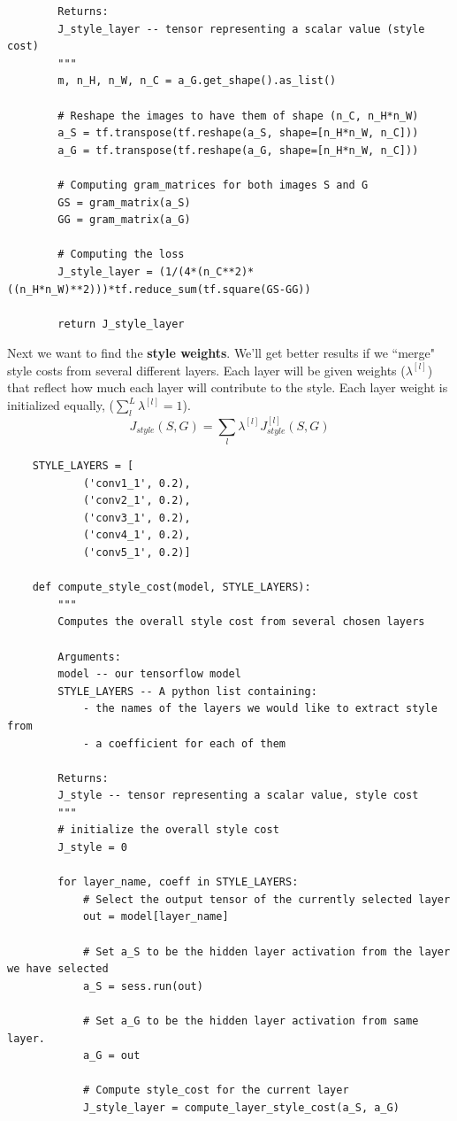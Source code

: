 \documentclass[11pt, a4paper]{article}
\begin{document}
\begin{spacing}{1.1}
\begin{lstlisting}
		Returns: 
		J_style_layer -- tensor representing a scalar value (style cost)
		"""
		m, n_H, n_W, n_C = a_G.get_shape().as_list()
		
		# Reshape the images to have them of shape (n_C, n_H*n_W) 
		a_S = tf.transpose(tf.reshape(a_S, shape=[n_H*n_W, n_C]))
		a_G = tf.transpose(tf.reshape(a_G, shape=[n_H*n_W, n_C]))
		
		# Computing gram_matrices for both images S and G 
		GS = gram_matrix(a_S)
		GG = gram_matrix(a_G)
		
		# Computing the loss
		J_style_layer = (1/(4*(n_C**2)*((n_H*n_W)**2)))*tf.reduce_sum(tf.square(GS-GG))
		
		return J_style_layer \end{lstlisting} \newpage

	\noindent Next we want to find the \textbf{style weights}. We'll get better results if we ``merge" style costs from several different layers. Each layer will be given weights ($\lambda^{[l]}$) that reflect how much each layer will contribute to the style. Each layer weight is initialized equally, ($\sum_{l}^L\lambda^{[l]} = 1$). 
	$$J_{style}(S,G) = \sum_{l} \lambda^{[l]} J^{[l]}_{style}(S,G)$$
	\begin{lstlisting}
	STYLE_LAYERS = [
			('conv1_1', 0.2),
			('conv2_1', 0.2),
			('conv3_1', 0.2),
			('conv4_1', 0.2),
			('conv5_1', 0.2)]
			
	def compute_style_cost(model, STYLE_LAYERS):
		"""
		Computes the overall style cost from several chosen layers
		
		Arguments:
		model -- our tensorflow model
		STYLE_LAYERS -- A python list containing:
			- the names of the layers we would like to extract style from
			- a coefficient for each of them
		
		Returns: 
		J_style -- tensor representing a scalar value, style cost
		"""
		# initialize the overall style cost
		J_style = 0
		
		for layer_name, coeff in STYLE_LAYERS:
			# Select the output tensor of the currently selected layer
			out = model[layer_name]
			
			# Set a_S to be the hidden layer activation from the layer we have selected
			a_S = sess.run(out)
			
			# Set a_G to be the hidden layer activation from same layer.
			a_G = out
			
			# Compute style_cost for the current layer
			J_style_layer = compute_layer_style_cost(a_S, a_G)
			

\end{lstlisting}
\end{spacing}
\end{document}
